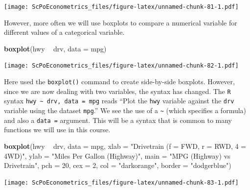 \documentclass[]{book}
\newenvironment{Shaded}{\begin{snugshade}}{\end{snugshade}}
\newcommand{\KeywordTok}[1]{\textcolor[rgb]{0.13,0.29,0.53}{\textbf{#1}}}
\newcommand{\DataTypeTok}[1]{\textcolor[rgb]{0.13,0.29,0.53}{#1}}
\newcommand{\DecValTok}[1]{\textcolor[rgb]{0.00,0.00,0.81}{#1}}
\newcommand{\StringTok}[1]{\textcolor[rgb]{0.31,0.60,0.02}{#1}}
\newcommand{\OperatorTok}[1]{\textcolor[rgb]{0.81,0.36,0.00}{\textbf{#1}}}
\newcommand{\NormalTok}[1]{#1}
\theoremstyle{definition}
\theoremstyle{definition}
\theoremstyle{definition}
\theoremstyle{remark}
\begin{document}
\begin{Shaded}
\end{Shaded}

\texttt{[image: ScPoEconometrics\_files/figure-latex/unnamed-chunk-81-1.pdf]}

However, more often we will use boxplots to compare a numerical variable
for different values of a categorical variable.

\begin{Shaded}
\begin{Highlighting}[]
\KeywordTok{boxplot}\NormalTok{(hwy }\OperatorTok{~}\StringTok{ }\NormalTok{drv, }\DataTypeTok{data =}\NormalTok{ mpg)}
\end{Highlighting}
\end{Shaded}

\texttt{[image: ScPoEconometrics\_files/figure-latex/unnamed-chunk-82-1.pdf]}

Here used the \texttt{boxplot()} command to create side-by-side
boxplots. However, since we are now dealing with two variables, the
syntax has changed. The \texttt{R} syntax
\texttt{hwy\ \textasciitilde{}\ drv,\ data\ =\ mpg} reads ``Plot the
\texttt{hwy} variable against the \texttt{drv} variable using the
dataset \texttt{mpg}.'' We see the use of a \texttt{\textasciitilde{}}
(which specifies a formula) and also a \texttt{data\ =} argument. This
will be a syntax that is common to many functions we will use in this
course.

\begin{Shaded}
\begin{Highlighting}[]
\KeywordTok{boxplot}\NormalTok{(hwy }\OperatorTok{~}\StringTok{ }\NormalTok{drv, }\DataTypeTok{data =}\NormalTok{ mpg,}
     \DataTypeTok{xlab   =} \StringTok{"Drivetrain (f = FWD, r = RWD, 4 = 4WD)"}\NormalTok{,}
     \DataTypeTok{ylab   =} \StringTok{"Miles Per Gallon (Highway)"}\NormalTok{,}
     \DataTypeTok{main   =} \StringTok{"MPG (Highway) vs Drivetrain"}\NormalTok{,}
     \DataTypeTok{pch    =} \DecValTok{20}\NormalTok{,}
     \DataTypeTok{cex    =} \DecValTok{2}\NormalTok{,}
     \DataTypeTok{col    =} \StringTok{"darkorange"}\NormalTok{,}
     \DataTypeTok{border =} \StringTok{"dodgerblue"}\NormalTok{)}
\end{Highlighting}
\end{Shaded}

\texttt{[image: ScPoEconometrics\_files/figure-latex/unnamed-chunk-83-1.pdf]}
\end{document}
